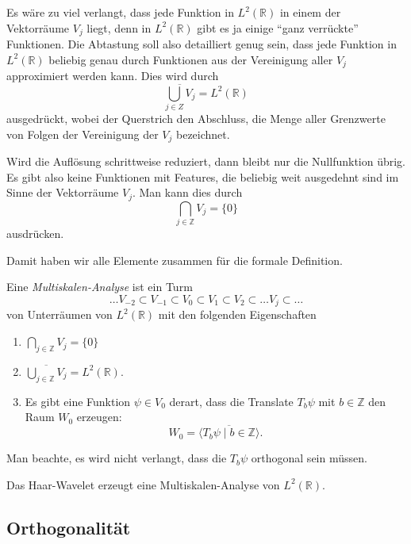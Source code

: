 Es wäre zu viel verlangt, dass jede Funktion in $L^2(\mathbb R)$ in
einem der Vektorräume $V_j$ liegt, denn in $L^2(\mathbb R)$ gibt
es ja einige ``ganz verrückte'' Funktionen.
Die Abtastung soll also detailliert genug sein, dass jede 
Funktion in $L^2(\mathbb R)$ beliebig genau durch Funktionen aus
der Vereinigung aller $V_j$ approximiert werden kann.
Dies wird durch
\[
\overline{\bigcup_{j\in Z} V_j} = L^2(\mathbb R)
\]
ausgedrückt, wobei der Querstrich den Abschluss, die Menge aller Grenzwerte
von Folgen der Vereinigung der $V_j$ bezeichnet.

Wird die Auflösung schrittweise reduziert, dann bleibt nur die Nullfunktion
übrig.
Es gibt also keine Funktionen mit Features, die beliebig weit ausgedehnt
sind im Sinne der Vektorräume $V_j$.
Man kann dies durch
\[
\bigcap_{j\in\mathbb Z} V_j = \{0\}
\]
ausdrücken.

Damit haben wir alle Elemente zusammen für die formale Definition.

\begin{definition}
Eine {\em Multiskalen-Analyse} ist ein Turm
\[
\dots
V_{-2}\subset
V_{-1}\subset
V_0\subset
V_1\subset
V_2\subset
\dots
V_j\subset
\dots
\]
von Unterräumen von $L^2(\mathbb R)$
mit den folgenden Eigenschaften
\begin{enumerate}
\item $\bigcap_{j\in\mathbb Z} V_j = \{0\}$
\item $\overline{\bigcup_{j\in\mathbb Z} V_j} = L^2(\mathbb R)$.
\item Es gibt eine Funktion $\psi\in V_0$ derart, dass
die Translate $T_b\psi$ mit $b\in\mathbb Z$ den Raum $W_0$ erzeugen:
\[
W_0 = \overline{\langle T_b\psi\;|\;b\in\mathbb Z\rangle}.
\]
\end{enumerate}
\end{definition}

Man beachte, es wird nicht verlangt, dass die $T_b\psi$ orthogonal
sein müssen.

\begin{beispiel}
Das Haar-Wavelet erzeugt eine Multiskalen-Analyse von $L^2(\mathbb R)$.
\end{beispiel}

\begin{beispiel}
\end{beispiel}

\subsection{Orthogonalität}

